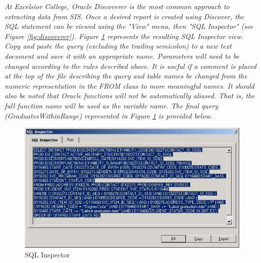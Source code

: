 \documentclass[letterpaper,11pt]{article}
\begin{document}
\textit{At Excelsior College, Oracle Discoverer is the most common approach to extracting data from SIS. Once a desired report is created using Discover, the SQL statement can be viewed using the "View" menu, then "SQL Inspector" (see Figure \ref{fig:discoverer}). Figure \ref{fig:sqlinspector} represents the resulting SQL Inspector view. Copy and paste the query (excluding the trailing semicolon) to a new text document and save it with an appropriate name. Parameters will need to be changed according to the rules described above. It is useful if a comment is placed at the top of the file describing the query and table names be changed from the numeric representation in the FROM claus to more meaningful names. It should also be noted that Oracle functions will not be automatically aliased. That is, the full function name will be used as the variable name. The final query (GraduatesWithinRange) represented in Figure \ref{fig:sqlinspector} is provided below.}

\begin{figure}[h]
\begin{center}
\includegraphics{SQLInspector}
\caption{SQL Inspector}
\label{fig:sqlinspector}
\end{center}
\end{figure}
\end{document}
